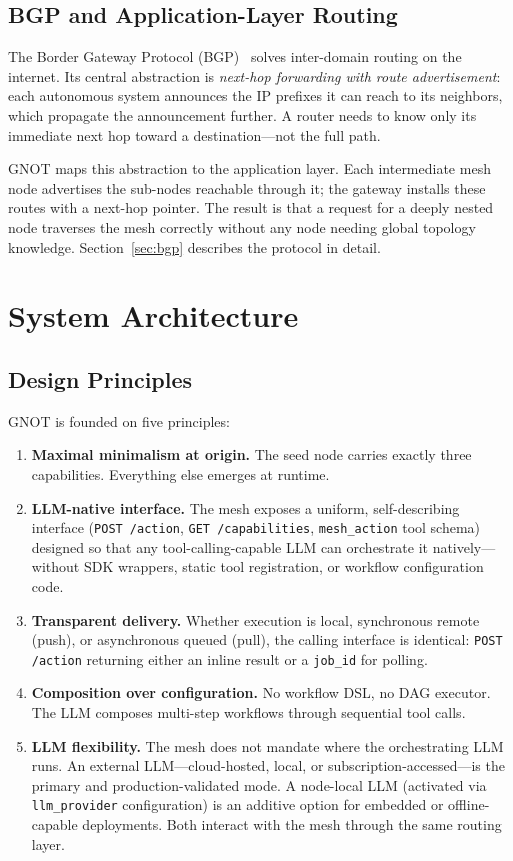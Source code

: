 \documentclass[10pt,twocolumn]{article}
\begin{document}
\subsection{BGP and Application-Layer Routing}

The Border Gateway Protocol (BGP)~\cite{rekhter1995bgp} solves
inter-domain routing on the internet. Its central abstraction is
\emph{next-hop forwarding with route advertisement}: each autonomous
system announces the IP prefixes it can reach to its neighbors, which
propagate the announcement further. A router needs to know only its
immediate next hop toward a destination---not the full path.

GNOT maps this abstraction to the application layer. Each intermediate
mesh node advertises the sub-nodes reachable through it; the gateway
installs these routes with a next-hop pointer. The result is that a
request for a deeply nested node traverses the mesh correctly without
any node needing global topology knowledge. Section~\ref{sec:bgp}
describes the protocol in detail.

\section{System Architecture}
\label{sec:arch}

\subsection{Design Principles}

GNOT is founded on five principles:

\begin{enumerate}[noitemsep, leftmargin=14pt]
  \item \textbf{Maximal minimalism at origin.} The seed node carries
    exactly three capabilities. Everything else emerges at runtime.
  \item \textbf{LLM-native interface.} The mesh exposes a uniform,
    self-describing interface (\texttt{POST /action},
    \texttt{GET /capabilities}, \texttt{mesh\_action} tool schema)
    designed so that any tool-calling-capable LLM can orchestrate it
    natively---without SDK wrappers, static tool registration, or
    workflow configuration code.
  \item \textbf{Transparent delivery.} Whether execution is local,
    synchronous remote (push), or asynchronous queued (pull), the
    calling interface is identical: \texttt{POST /action} returning
    either an inline result or a \texttt{job\_id} for polling.
  \item \textbf{Composition over configuration.} No workflow DSL, no
    DAG executor. The LLM composes multi-step workflows through
    sequential tool calls.
  \item \textbf{LLM flexibility.} The mesh does not mandate where the
    orchestrating LLM runs. An external LLM---cloud-hosted, local, or
    subscription-accessed---is the primary and production-validated
    mode. A node-local LLM (activated via \texttt{llm\_provider}
    configuration) is an additive option for embedded or
    offline-capable deployments. Both interact with the mesh through
    the same routing layer.
\end{enumerate}
\end{document}
